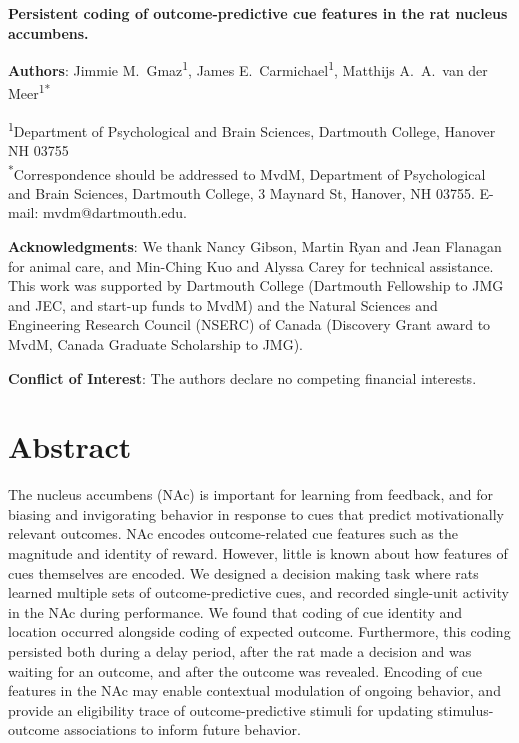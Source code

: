 \documentclass[11pt]{article}
\providecommand{\DIFadd}[1]{{\protect\color{red} \sf #1}} %
\providecommand{\DIFdel}[1]{} %
\providecommand{\DIFaddbegin}{} %
\providecommand{\DIFaddend}{} %
\providecommand{\DIFdelbegin}{} %
\providecommand{\DIFdelend}{} %
\newcommand{\DIFscaledelfig}{0.5}
\newlength{\DIFdelgraphicswidth} %
\newlength{\DIFdelgraphicsheight} %
\newcommand{\DIFaddincludegraphics}[2][]{{\color{red}\fbox{\DIFOincludegraphics[#1]{#2}}}} %
\newcommand{\DIFdelincludegraphics}[2][]{%
\sbox{\DIFdelgraphicsbox}{\DIFOincludegraphics[#1]{#2}}%
\settoboxwidth{\DIFdelgraphicswidth}{\DIFdelgraphicsbox} %
\settoboxtotalheight{\DIFdelgraphicsheight}{\DIFdelgraphicsbox} %
\scalebox{\DIFscaledelfig}{%
\parbox[b]{\DIFdelgraphicswidth}{\usebox{\DIFdelgraphicsbox}\\[-\baselineskip] \rule{\DIFdelgraphicswidth}{0em}}\llap{\resizebox{\DIFdelgraphicswidth}{\DIFdelgraphicsheight}{%
\setlength{\unitlength}{\DIFdelgraphicswidth}%
\begin{picture}(1,1)%
\thicklines\linethickness{2pt} %
{\color[rgb]{1,0,0}\put(0,0){\framebox(1,1){}}}%
{\color[rgb]{1,0,0}\put(0,0){\line( 1,1){1}}}%
{\color[rgb]{1,0,0}\put(0,1){\line(1,-1){1}}}%
\end{picture}%
}\hspace*{3pt}}} %
} %
\DeclareRobustCommand{\DIFaddbegin}{\DIFOaddbegin \let\includegraphics\DIFaddincludegraphics} %
\DeclareRobustCommand{\DIFaddend}{\DIFOaddend \let\includegraphics\DIFOincludegraphics} %
\DeclareRobustCommand{\DIFdelbegin}{\DIFOdelbegin \let\includegraphics\DIFdelincludegraphics} %
\DeclareRobustCommand{\DIFdelend}{\DIFOaddend \let\includegraphics\DIFOincludegraphics} %
\begin{document}
\renewcommand{\BBAB}{\BBAA}
\DIFaddbegin \renewcommand{\APACrefYearMonthDay}[3]{\APACrefYear{#1}}
\DIFaddend 

{\Large\bf Persistent coding of outcome-predictive cue features in the
  rat nucleus accumbens.}

{\bf Authors}: Jimmie M.\ Gmaz\textsuperscript{1}, James
E.\ Carmichael\textsuperscript{1}, Matthijs A.\ A.\ van der
Meer\textsuperscript{1*}

\textsuperscript{1}Department of Psychological and Brain Sciences,
Dartmouth College, Hanover NH
03755\\ 

\textsuperscript{*}Correspondence should be addressed to MvdM,
Department of Psychological and Brain Sciences, Dartmouth College, 3
Maynard St, Hanover, NH 03755. E-mail: {\sffamily mvdm@dartmouth.edu}.

\textbf{Acknowledgments}: We thank Nancy Gibson, Martin Ryan and Jean
Flanagan for animal care, and Min-Ching Kuo and
Alyssa Carey for technical assistance. This work was supported by
Dartmouth College (Dartmouth Fellowship to JMG and JEC, and start-up funds to
MvdM) and the Natural Sciences and Engineering Research Council
(NSERC) of Canada (Discovery Grant award to MvdM, Canada Graduate
Scholarship to JMG).

\textbf{Conflict of Interest}: The authors declare no competing
financial interests.\\

\newpage
\linenumbers

\section*{Abstract}

The nucleus accumbens (NAc) \DIFdelbegin \DIFdel{has been shown to be }\DIFdelend \DIFaddbegin \DIFadd{is }\DIFaddend important for learning from feedback,
and \DIFaddbegin \DIFadd{for }\DIFaddend biasing and invigorating behavior in response to \DIFdelbegin \DIFdel{outcome-predictive cues }\DIFdelend \DIFaddbegin \DIFadd{cues that
predict motivationally relevant outcomes}\DIFaddend . NAc encodes outcome-related
cue features such as the magnitude and identity of reward. However,
\DIFdelbegin \DIFdel{not
much }\DIFdelend \DIFaddbegin \DIFadd{little }\DIFaddend is known about how features of cues themselves are encoded.
We designed a decision making task where rats learned multiple sets of
outcome-predictive cues, and recorded single-unit activity in the NAc
during performance. We found that coding of \DIFdelbegin \DIFdel{various cue features
}\DIFdelend \DIFaddbegin \DIFadd{cue identity and location
}\DIFaddend occurred alongside coding of expected outcome. Furthermore, this
coding persisted both during a delay period, after the rat made a
decision and was waiting for an outcome, and after the outcome was
revealed. Encoding of cue features in the NAc may enable contextual
modulation of ongoing behavior, and provide an eligibility trace of
outcome-predictive stimuli for updating stimulus-outcome associations
to inform future behavior.
\end{document}
